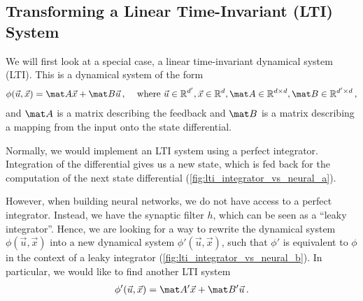 \documentclass[10pt,letterpaper,oneside]{article}
\begin{document}
\subsection{Transforming a Linear Time-Invariant (LTI) System}
We will first look at a special case, a linear time-invariant dynamical system (LTI). This is a dynamical system of the form
\begin{align*}
	\phi(\vec u, \vec x) = \mat A \vec x + \mat B \vec u \,, && \text{ where } \vec u \in \mathbb{R}^{d'}, \vec x \in \mathbb{R}^{d}, \mat A \in \mathbb{R}^{d \times d}, \mat B \in \mathbb{R}^{d' \times d} \,,
\end{align*}
and $\mat A$ is a matrix describing the feedback and $\mat B$ is a matrix describing a mapping from the input onto the state differential.

Normally, we would implement an LTI system using a perfect integrator. Integration of the differential gives us a new state, which is fed back for the computation of the next state differential (\cref{fig:lti_integrator_vs_neural_a}).

However, when building neural networks, we do not have access to a perfect integrator. Instead, we have the synaptic filter $h$, which can be seen as a \enquote{leaky integrator}. Hence, we are looking for a way to rewrite the dynamical system $\phi(\vec u, \vec x)$ into a new dynamical system $\phi'(\vec u, \vec x)$, such that $\phi'$ is equivalent to $\phi$ in the context of a leaky integrator (\cref{fig:lti_integrator_vs_neural_b}). In particular, we would like to find another LTI system
\begin{align*}
	\phi'(\vec u, \vec x) = \mat A' \vec x + \mat B' \vec u \,.
\end{align*}
\end{document}
